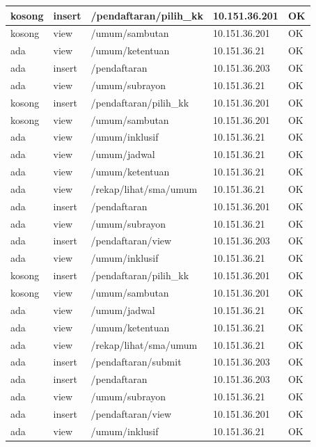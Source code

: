 \documentclass{ta-its}
\begin{document}
\begin{longtable}{|p{}|p{}|p{}|p{}|p{}|}
						kosong & insert & /pendaftaran/pilih\_kk & 10.151.36.201 & OK\\ \hline
						kosong & view & /umum/sambutan & 10.151.36.201 & OK\\ \hline
						ada & view & /umum/ketentuan & 10.151.36.21 & OK\\ \hline
						ada & insert & /pendaftaran & 10.151.36.203 & OK\\ \hline
						ada & view & /umum/subrayon & 10.151.36.21 & OK\\ \hline
						kosong & insert & /pendaftaran/pilih\_kk & 10.151.36.201 & OK\\ \hline
						kosong & view & /umum/sambutan & 10.151.36.201 & OK\\ \hline
						ada & view & /umum/inklusif & 10.151.36.21 & OK\\ \hline
						ada & view & /umum/jadwal & 10.151.36.21 & OK\\ \hline
						ada & view & /umum/ketentuan & 10.151.36.21 & OK\\ \hline
						ada & view & /rekap/lihat/sma/umum & 10.151.36.21 & OK\\ \hline
						ada & insert & /pendaftaran & 10.151.36.201 & OK\\ \hline
						ada & view & /umum/subrayon & 10.151.36.21 & OK\\ \hline
						ada & insert & /pendaftaran/view & 10.151.36.203 & OK\\ \hline
						ada & view & /umum/inklusif & 10.151.36.21 & OK\\ \hline
						kosong & insert & /pendaftaran/pilih\_kk & 10.151.36.201 & OK\\ \hline
						kosong & view & /umum/sambutan & 10.151.36.201 & OK\\ \hline
						ada & view & /umum/jadwal & 10.151.36.21 & OK\\ \hline
						ada & view & /umum/ketentuan & 10.151.36.21 & OK\\ \hline
						ada & view & /rekap/lihat/sma/umum & 10.151.36.21 & OK\\ \hline
						ada & insert & /pendaftaran/submit & 10.151.36.203 & OK\\ \hline
						ada & insert & /pendaftaran & 10.151.36.203 & OK\\ \hline
						ada & view & /umum/subrayon & 10.151.36.21 & OK\\ \hline
						ada & insert & /pendaftaran/view & 10.151.36.201 & OK\\ \hline
						ada & view & /umum/inklusif & 10.151.36.21 & OK\\ \hline

\end{longtable}
\end{document}
